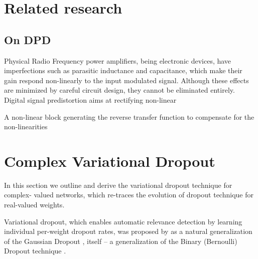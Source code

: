 \documentclass[a4paper,10pt]{article}
\begin{document}


\section{Related research} %
\label{sec:realted_research}

\subsection{On DPD} %
\label{sub:on_dpd}

Physical Radio Frequency power amplifiers, being electronic devices, have imperfections
such as parasitic inductance and capacitance, which make their gain respond non-linearly
to the input modulated signal. Although these effects are minimized by careful circuit
design, they cannot be eliminated entirely. Digital signal predistortion aims at rectifying
non-linear

 A non-linear block generating the reverse transfer
    function to compensate for the non-linearities



\section{Complex Variational Dropout} %
\label{sec:complex_varaitional_dropout}

In this section we outline and derive the variational dropout technique for complex-%
valued networks, which re-traces the evolution of dropout technique for real-valued
weights.

Variational dropout, which enables automatic relevance detection by learning individual
per-weight dropout rates, was proposed by \cite{kingma_variational_2015} as a natural
generalization of the Gaussian Dropout \cite{srivastava_dropout_2014,wang_fast_2013},
itself -- a generalization of the Binary (Bernoulli) Dropout technique \cite{hinton_improving_2012}.
\end{document}
